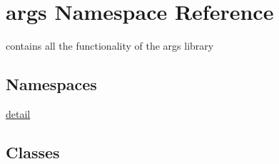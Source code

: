 \hypertarget{namespaceargs}{}\section{args Namespace Reference}
\label{namespaceargs}


contains all the functionality of the args library  


\subsection*{Namespaces}
\begin{DoxyCompactItemize}
\item 
 \hyperlink{namespaceargs_1_1detail}{detail}
\end{DoxyCompactItemize}
\subsection*{Classes}
